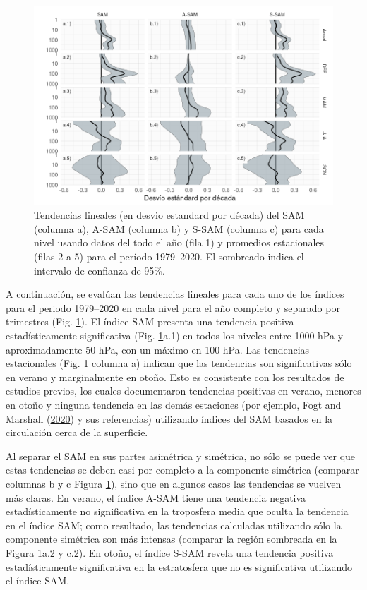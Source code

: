 \documentclass[12pt,oneside,a4paper]{reedthesis}
\begin{document}
\begin{figure}

{\centering \includegraphics{figures/30-sam/trends-1} 

}

\caption{Tendencias lineales (en desvio estandard por década) del SAM (columna a), A-SAM (columna b) y S-SAM (columna c) para cada nivel usando datos del todo el año (fila 1) y promedios estacionales (filas 2 a 5) para el período 1979--2020. El sombreado indica el intervalo de confianza de 95\%.}\label{fig:trends}
\end{figure}

A continuación, se evalúan las tendencias lineales para cada uno de los índices para el periodo 1979--2020 en cada nivel para el año completo y separado por trimestres (Fig. \ref{fig:trends}).
El índice SAM presenta una tendencia positiva estadísticamente significativa (Fig. \ref{fig:trends}a.1) en todos los niveles entre 1000 hPa y aproximadamente 50 hPa, con un máximo en 100 hPa.
Las tendencias estacionales (Fig. \ref{fig:trends} columna a) indican que las tendencias son significativas sólo en verano y marginalmente en otoño.
Esto es consistente con los resultados de estudios previos, los cuales documentaron tendencias positivas en verano, menores en otoño y ninguna tendencia en las demás estaciones (por ejemplo, Fogt and Marshall (\protect\hyperlink{ref-fogt2020}{2020}) y sus referencias) utilizando índices del SAM basados en la circulación cerca de la superficie.

Al separar el SAM en sus partes asimétrica y simétrica, no sólo se puede ver que estas tendencias se deben casi por completo a la componente simétrica (comparar columnas b y c Figura \ref{fig:trends}), sino que en algunos casos las tendencias se vuelven más claras.
En verano, el índice A-SAM tiene una tendencia negativa estadísticamente no significativa en la troposfera media que oculta la tendencia en el índice SAM; como resultado, las tendencias calculadas utilizando sólo la componente simétrica son más intensas (comparar la región sombreada en la Figura \ref{fig:trends}a.2 y c.2).
En otoño, el índice S-SAM revela una tendencia positiva estadísticamente significativa en la estratosfera que no es significativa utilizando el índice SAM.
\end{document}
